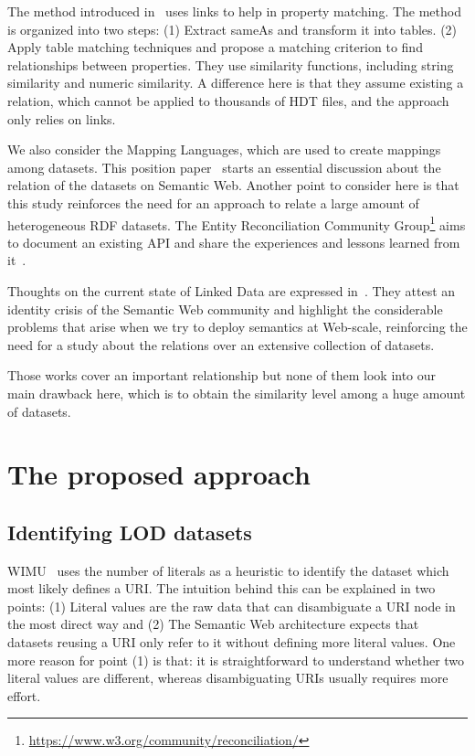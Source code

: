 \documentclass[sw]{iosart2x}
\begin{document}
The method introduced in~\cite{xie2018instance} uses  links to help in property matching.
The method is organized into two steps:
(1) Extract sameAs and transform it into tables.
(2) Apply table matching techniques and propose a matching criterion to find relationships between properties.
They use similarity functions, including string similarity and numeric similarity.
A difference here is that they assume existing a  relation, which cannot be applied to thousands of HDT files, and the approach only relies on  links.

We also consider the Mapping Languages, which are used to create mappings among datasets. This position paper~\cite{de2019mapping} starts an essential discussion about the relation of the datasets on Semantic Web. Another point to consider here is that this study reinforces the need for an approach to relate a large amount of heterogeneous RDF datasets.
The Entity Reconciliation Community Group\footnote{\url{https://www.w3.org/community/reconciliation/}} aims to document an existing API and share the experiences and lessons learned from it~\cite{DBLP:journals/corr/abs-1906-08092}.

Thoughts on the current state of Linked Data are expressed in~\cite{verborgh_swj_2020}.
They attest an identity crisis of the Semantic Web community and highlight the considerable problems that arise when we try to deploy semantics at Web-scale, reinforcing the need for a study about the relations over an extensive collection of datasets.

Those works cover an important relationship but none of them look into our main drawback here, which is to obtain the similarity level among a huge amount of datasets.

\section{The proposed approach}
\label{sec:approach}

\subsection{Identifying LOD datasets}
WIMU~\cite{valdestilhas2018my} uses the number of literals as a heuristic to identify the dataset which most likely defines a URI.
The intuition behind this can be explained in two points: 
(1) Literal values are the raw data that can disambiguate a URI node in the most direct way and 
(2) The Semantic Web architecture expects that datasets reusing a URI only refer to it without defining more literal values.
One more reason for point (1) is that: it is straightforward to understand whether two literal values are different, whereas disambiguating URIs usually requires more effort.
\end{document}
